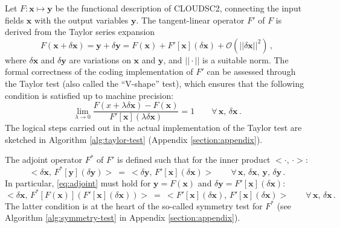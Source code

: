 \documentclass[gmd,manuscript,online]{copernicus}
\begin{document}
	Let $F: \boldsymbol{x} \mapsto \boldsymbol{y}$ be the functional description of CLOUDSC2, connecting the input fields $\boldsymbol{x}$ with the output variables $\boldsymbol{y}$. The tangent-linear operator $F'$ of $F$ is derived from the Taylor series expansion
	\begin{equation}
		F \left( \boldsymbol{x} + \delta \boldsymbol{x} \right) = \boldsymbol{y} + \delta \boldsymbol{y} = F \left( \boldsymbol{x} \right) + F' \left[ \boldsymbol{x} \right] \left( \delta \boldsymbol{x} \right) + \mathcal{O} \left( ||\delta \boldsymbol{x} ||^2 \right) \, ,
	\end{equation}
	where $\delta \boldsymbol{x}$ and $\delta \boldsymbol{y}$ are variations on $\boldsymbol{x}$ and $\boldsymbol{y}$, and $|| \cdot ||$ is a suitable norm. The formal correctness of the coding implementation of $F'$ can be assessed through the Taylor test (also called the ``V-shape'' test), which ensures that the following condition is satisfied up to machine precision:
	\begin{equation}
		\lim_{\lambda \to 0} \dfrac{F \left( x + \lambda \delta \boldsymbol{x} \right) - F \left( \boldsymbol{x} \right)}{F' \left[ \boldsymbol{x} \right] \left( \lambda \delta \boldsymbol{x} \right)} = 1 \qquad \forall \, \boldsymbol{x}, \, \delta \boldsymbol{x} \, .
	\end{equation}
	The logical steps carried out in the actual implementation of the Taylor test are sketched in Algorithm \ref{alg:taylor-test} (Appendix \ref{section:appendix}).

	The adjoint operator $F^*$ of $F'$ is defined such that for the inner product $< \cdot, \, \cdot >$:
	\begin{equation}
		\label{eq:adjoint}
		< \delta \boldsymbol{x}, \, F^* \left[ \boldsymbol{y} \right] \left( \delta \boldsymbol{y} \right) > ~ = ~ < \delta \boldsymbol{y}, \, F' \left[ \boldsymbol{x} \right] \left( \delta \boldsymbol{x} \right) > \qquad \forall \, \boldsymbol{x}, \, \delta \boldsymbol{x}, \, \boldsymbol{y}, \, \delta \boldsymbol{y} \, .
	\end{equation}
	In particular, \eqref{eq:adjoint} must hold for $\boldsymbol{y} = F \left( \boldsymbol{x} \right)$ and $\delta \boldsymbol{y} = F' \left[ \boldsymbol{x} \right] \left( \delta \boldsymbol{x} \right)$:
	\begin{equation}
		\label{eq:symmetry-test}
		< \delta \boldsymbol{x}, \, F^* \left[ F \left( \boldsymbol{x} \right) \right] \left( F' \left[ \boldsymbol{x} \right] \left( \delta \boldsymbol{x} \right) \right) > ~ = ~ < F' \left[ \boldsymbol{x} \right] \left( \delta \boldsymbol{x} \right), \, F' \left[ \boldsymbol{x} \right] \left( \delta \boldsymbol{x} \right) > \qquad \forall \, \boldsymbol{x}, \, \delta \boldsymbol{x} \, .
	\end{equation}
	The latter condition is at the heart of the so-called symmetry test for $F^*$ (see Algorithm \ref{alg:symmetry-test} in Appendix \ref{section:appendix}).
\end{document}

